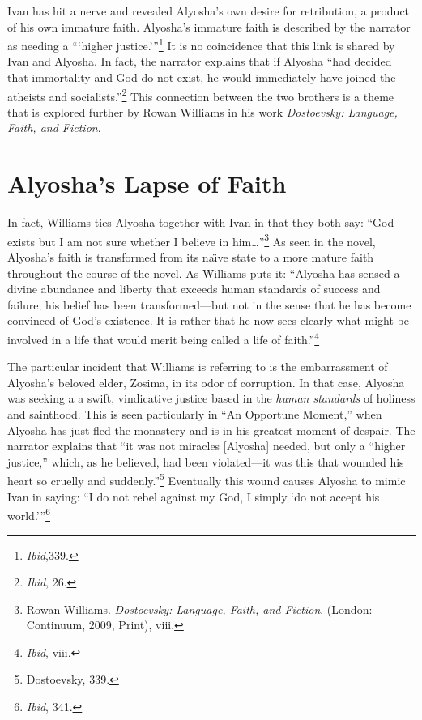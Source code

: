 Ivan has hit a nerve and revealed Alyosha's own desire for retribution, a product of his own immature faith. Alyosha's immature faith is described by the narrator as needing a ```higher justice.'''\footnote{\emph{Ibid},339.} It is no coincidence that this link is shared by Ivan and Alyosha. In fact, the narrator explains that if Alyosha ``had decided that immortality and God do not exist, he would immediately have joined the atheists and socialists.''\footnote{\emph{Ibid}, 26.} This connection between the two brothers is a theme that is explored further by Rowan Williams in his work \emph{Dostoevsky: Language, Faith, and Fiction}. 

\section{Alyosha's Lapse of Faith}
In fact, Williams ties Alyosha together with Ivan in that they both say: ``God exists but I am not sure whether I believe in him\ldots''\footnote{Rowan Williams. \emph{Dostoevsky: Language, Faith, and Fiction}. (London: Continuum, 2009, Print), viii.} As seen in the novel, Alyosha's faith is transformed from its na\"{\i}ve state to a more mature faith throughout the course of the novel. As Williams puts it: ``Alyosha has sensed a divine abundance and liberty that exceeds human standards of success and failure; his belief has been transformed---but not in the sense that he has become convinced of God's existence. It is rather that he now sees clearly what might be involved in a life that would merit being called a life of faith.''\footnote{\emph{Ibid}, viii.} 

The particular incident that Williams is referring to is the embarrassment of Alyosha's beloved elder, Zosima, in its odor of corruption. In that case, Alyosha was seeking a a swift, vindicative justice based in the \emph{human standards} of holiness and sainthood. This is seen particularly in ``An Opportune Moment,'' when Alyosha has just fled the monastery and is in his greatest moment of despair. The narrator explains that ``it was not miracles [Alyosha] needed, but only a ``higher justice,'' which, as he believed, had been violated---it was this that wounded his heart so cruelly and suddenly.''\footnote{Dostoevsky, 339.} Eventually this wound causes Alyosha to mimic Ivan in saying: ``I do not rebel against my God, I simply `do not accept his world.'''\footnote{\emph{Ibid}, 341.}

